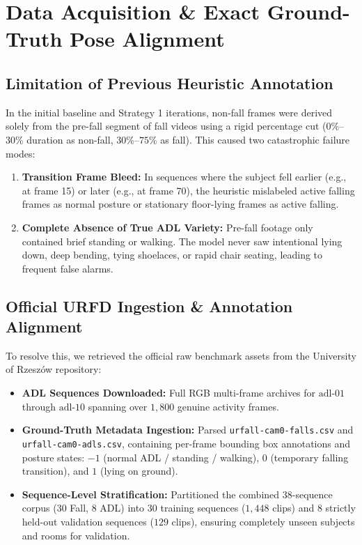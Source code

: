 \documentclass[11pt,a4paper]{article}
\begin{document}
\section{Data Acquisition \& Exact Ground-Truth Pose Alignment}

\subsection{Limitation of Previous Heuristic Annotation}
In the initial baseline and Strategy 1 iterations, non-fall frames were derived solely from the pre-fall segment of fall videos using a rigid percentage cut ($0\%$--$30\%$ duration as non-fall, $30\%$--$75\%$ as fall). This caused two catastrophic failure modes:
\begin{enumerate}\setlength{\itemsep}{0.2em}
    \item \textbf{Transition Frame Bleed:} In sequences where the subject fell earlier (e.g., at frame 15) or later (e.g., at frame 70), the heuristic mislabeled active falling frames as normal posture or stationary floor-lying frames as active falling.
    \item \textbf{Complete Absence of True ADL Variety:} Pre-fall footage only contained brief standing or walking. The model never saw intentional lying down, deep bending, tying shoelaces, or rapid chair seating, leading to frequent false alarms.
\end{enumerate}

\subsection{Official URFD Ingestion \& Annotation Alignment}
To resolve this, we retrieved the official raw benchmark assets from the University of Rzesz\'{o}w repository:
\begin{itemize}\setlength{\itemsep}{0.2em}
    \item \textbf{ADL Sequences Downloaded:} Full RGB multi-frame archives for $\text{adl-01}$ through $\text{adl-10}$ spanning over $1{,}800$ genuine activity frames.
    \item \textbf{Ground-Truth Metadata Ingestion:} Parsed \texttt{urfall-cam0-falls.csv} and \texttt{urfall-cam0-adls.csv}, containing per-frame bounding box annotations and posture states: $-1$ (normal ADL / standing / walking), $0$ (temporary falling transition), and $1$ (lying on ground).
    \item \textbf{Sequence-Level Stratification:} Partitioned the combined 38-sequence corpus (30 Fall, 8 ADL) into 30 training sequences ($1{,}448$ clips) and 8 strictly held-out validation sequences ($129$ clips), ensuring completely unseen subjects and rooms for validation.
\end{itemize}
\end{document}
